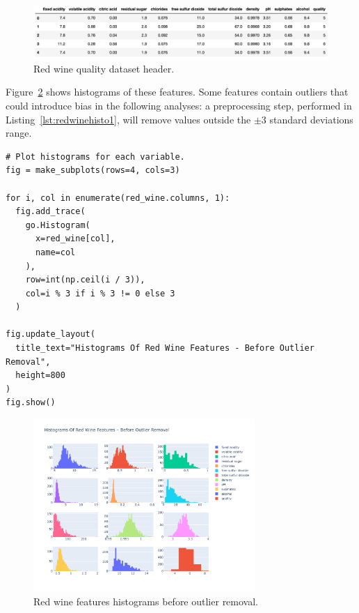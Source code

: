 \documentclass[12pt]{article}
\begin{document}
  \begin{figure}[!ht]
    \centering
    \includegraphics[width=\textwidth]{figures/redwineheader}
    \caption{Red wine quality dataset header.}%
    \label{fig:redwineheader}
  \end{figure} 

  Figure~\ref{fig:redwinehisto1} shows histograms of these features. Some
  features contain outliers that could introduce bias in the following
  analyses: a preprocessing step, performed in Listing~\ref{lst:redwinehisto1},
  will remove values outside the $\pm 3$ standard deviations range.

  \begin{lstlisting}[caption={Preprocessing step.}, captionpos=b,
    label={lst:redwinehisto1}]
# Plot histograms for each variable.
fig = make_subplots(rows=4, cols=3)

for i, col in enumerate(red_wine.columns, 1):
  fig.add_trace(
    go.Histogram(
      x=red_wine[col],
      name=col
    ), 
    row=int(np.ceil(i / 3)), 
    col=i % 3 if i % 3 != 0 else 3
  )

fig.update_layout(
  title_text="Histograms Of Red Wine Features - Before Outlier Removal",
  height=800
)
fig.show() 
  \end{lstlisting}

  \begin{figure}[!ht]
    \centering
    \includegraphics[width=0.75\textwidth]{figures/redwinehisto1}
    \caption{Red wine features histograms before outlier removal.}%
    \label{fig:redwinehisto1}
  \end{figure} 
\end{document}
